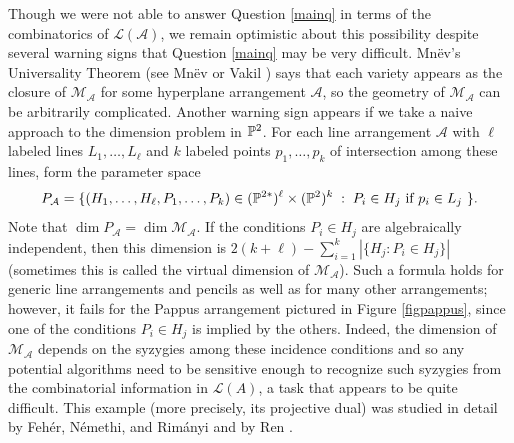 \documentclass[12pt]{article}
\theoremstyle{plain}
\theoremstyle{definition}
\newcommand{\A}{\mathcal{A}}
\newcommand{\M}{\mathcal{M}}
\renewcommand{\L}{\mathcal{L}}
\renewcommand{\P}{\ensuremath \mathbb{P}}
\begin{document}
Though we were not able to answer Question \ref{mainq} in terms of the
combinatorics of $\L(\A)$, we remain optimistic about this possibility
despite several warning signs that Question \ref{mainq} may be very
difficult. Mn\"{e}v's Universality Theorem (see Mn\"{e}v \cite{Mnev}
or Vakil \cite{VakilMurphy}) says that each variety appears as the
closure of $\M_\A$ for some hyperplane arrangement $\A$, so the
geometry of $\M_\A$ can be arbitrarily complicated. Another warning
sign appears if we take a naive approach to the dimension problem in
$\P^2$.  For each line arrangement $\A$ with $\ell$ labeled lines
$L_1, \ldots, L_\ell$ and $k$ labeled points $p_1, \ldots, p_k$ of
intersection among these lines, form the parameter space
$$ P_\A = \{ (H_1, \ldots, H_\ell, P_1, \ldots, P_k) \in (\P^{2*})^\ell \times
(\P^2)^k \; : \; P_i \in H_j \text{ if $p_i \in L_j$ }\}. $$ Note that
$\dim P_{\A} = \dim \M_\A$. If the conditions $P_i \in H_j$ are
algebraically independent, then this dimension is $2(k+\ell) -
\sum_{i=1}^k |\{ H_j : P_i \in H_j\}|$ (sometimes this is called the
virtual dimension of $\M_\A$). Such a formula holds for
generic line arrangements and pencils as well as for many other
arrangements; however, it fails for the Pappus arrangement pictured in
Figure \ref{figpappus}, since one
of the conditions $P_i \in H_j$ is implied by the others. Indeed, the
dimension of $\M_\A$ depends on the syzygies among these incidence
conditions and so any potential algorithms need to be sensitive enough
to recognize such syzygies from the combinatorial information in
$\L(A)$, a task that appears to be quite difficult. This example (more
precisely, its projective dual) was studied in detail by Feh{\'e}r,
N{\'e}methi, and Rim{\'a}nyi \cite{Rimanyi} and by Ren \cite{Ren}. 
\end{document}
